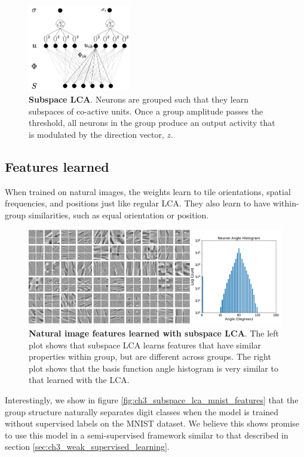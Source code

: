 \begin{figure}[h]
    \centering
    \includegraphics[width=0.4\textwidth]{figures/subspace_lca_graph.png}
    \caption{\textbf{Subspace LCA}. Neurons are grouped such that they learn subspaces of co-active units. Once a group amplitude passes the threshold, all neurons in the group produce an output activity that is modulated by the direction vector, $z$.}
    \label{fig:ch3_subspace_lca_graph}
\end{figure}

\subsection{Features learned}
When trained on natural images, the weights learn to tile orientations, spatial frequencies, and positions just like regular LCA. They also learn to have within-group similarities, such as equal orientation or position.

\begin{figure}[h]
    \centering
    \includegraphics[width=\textwidth]{figures/subspace_lca_vh_features.png}
    \caption{\textbf{Natural image features learned with subspace LCA}. The left plot shows that subspace LCA learns features that have similar properties within group, but are different across groups. The right plot shows that the basis function angle histogram is very similar to that learned with the LCA.}
    \label{fig:ch3_subspace_lca_vh_features}
\end{figure}

Interestingly, we show in figure \ref{fig:ch3_subspace_lca_mnist_features} that the group structure naturally separates digit classes when the model is trained without supervised labels on the MNIST dataset. We believe this shows promise to use this model in a semi-supervised framework similar to that described in section \ref{sec:ch3_weak_supervised_learning}.


